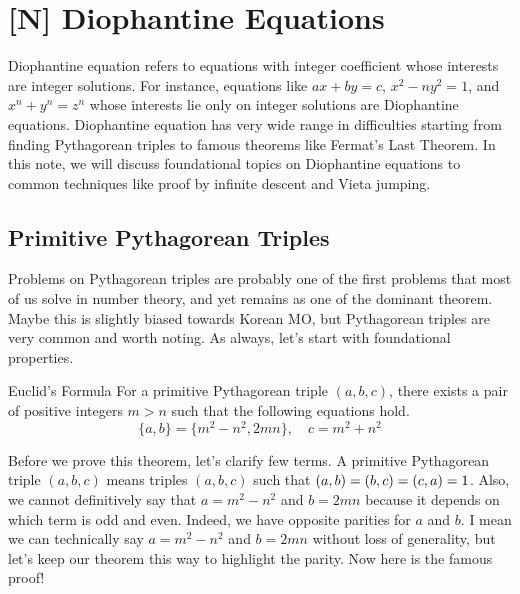 \documentclass[../../../main.tex]{subfiles}
\begin{document}
\chapter{[N] Diophantine Equations}

Diophantine equation refers to equations with integer coefficient
whose interests are integer solutions. For instance, equations like
$ax + by = c$, $x^2 - ny^2 = 1$, and $x^n + y^n = z^n$ whose
interests lie only on integer solutions are Diophantine equations.
Diophantine equation has very wide range in difficulties starting
from finding Pythagorean triples to famous theorems like
Fermat's Last Theorem. In this note, we will discuss foundational
topics on Diophantine equations to common techniques like proof
by infinite descent and Vieta jumping.

\section{Primitive Pythagorean Triples}

Problems on Pythagorean triples are probably one of the first
problems that most of us solve in number theory, and yet
remains as one of the dominant theorem. Maybe this is slightly
biased towards Korean MO, but Pythagorean triples are very
common and worth noting. As always, let's start with foundational
properties.

\begin{theorem}{}{Euclid's Formula}
For a primitive Pythagorean triple $(a, b, c)$, there exists a pair
of positive integers $m > n$ such that the following equations hold.
\vspace{-0.6\baselineskip}
\[
\{ a, b \} = \{ m^2 - n^2, 2mn \}, \quad
c = m^2 + n^2
\]
\end{theorem}

Before we prove this theorem, let's clarify few terms. A primitive
Pythagorean triple $(a, b, c)$ means triples $(a, b, c)$ such that
$(a, b) = (b, c) \linebreak = (c, a) = 1$. Also, we cannot
definitively say that $a = m^2 - n^2$ and $b = 2mn$ because it depends
on which term is odd and even. Indeed, we have opposite parities for
$a$ and $b$. I mean we can technically say $a = m^2 - n^2$ and
$b = 2mn$ without loss of generality, but let's keep our theorem
this way to highlight the parity. Now here is the famous proof!
\end{document}
